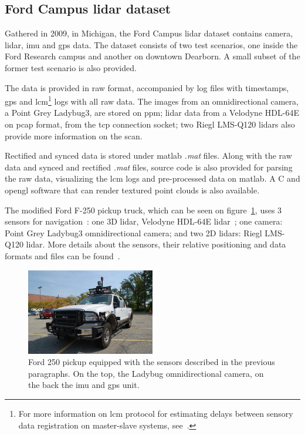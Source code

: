 \subsection{Ford Campus \acl{lidar} dataset}
Gathered in 2009, in Michigan, the Ford Campus \ac{lidar} dataset contains camera, \ac{lidar}, \ac{imu} and \ac{gps} data. The dataset consists of two test scenarios, one inside the Ford Research campus and another on downtown Dearborn. A small subset of the former test scenario is also provided.

The data is provided in raw format, accompanied by log files with timestamps, \ac{gps} and \ac{lcm}\footnote{For more information on \acf{lcm} protocol for estimating delays between sensory data registration on master-slave systems, see~\cite{VelodyneHDL64}.} logs with all raw data. The images from an omnidirectional camera, a Point Grey Ladybug3, are stored on \ac{ppm}; \ac{lidar} data from a Velodyne HDL-64E on \ac{pcap} format, from the \ac{tcp} connection socket; two Riegl LMS-Q120 \acp{lidar} also provide more information on the scan.

Rectified and synced data is stored under \ac{matlab} \textit{.mat} files. Along with the raw data and synced and rectified \textit{.mat} files, source code is also provided for parsing the raw data, visualizing the \ac{lcm} logs and pre-processed data on \ac{matlab}. A C and \ac{opengl} software that can render textured point clouds is also available.

The modified Ford F-250 pickup truck, which can be seen on figure~\ref{fig:sota:ford_sensors}, uses 3 sensors for navigation~\cite{Pandey2011}: one 3D \ac{lidar}, Velodyne HDL-64E \ac{lidar}~\cite{VelodyneHDL64}; one camera: Point Grey Ladybug3 omnidirectional camera; and two 2D \acp{lidar}: Riegl LMS-Q120 lidar. More details about the sensors, their relative positioning and data formats and files can be found~\cite{Pandey2011}.

\begin{figure}
	\centering
	\includegraphics[width=0.5\textwidth]{img/sensor_fusion/ford_sensors.jpg}
	\caption{Ford 250 pickup equipped with the sensors described in the previous paragraphs. On the top, the Ladybug omnidirectional camera, on the back the \ac{imu} and \ac{gps} unit.}
	\label{fig:sota:ford_sensors}
\end{figure}


